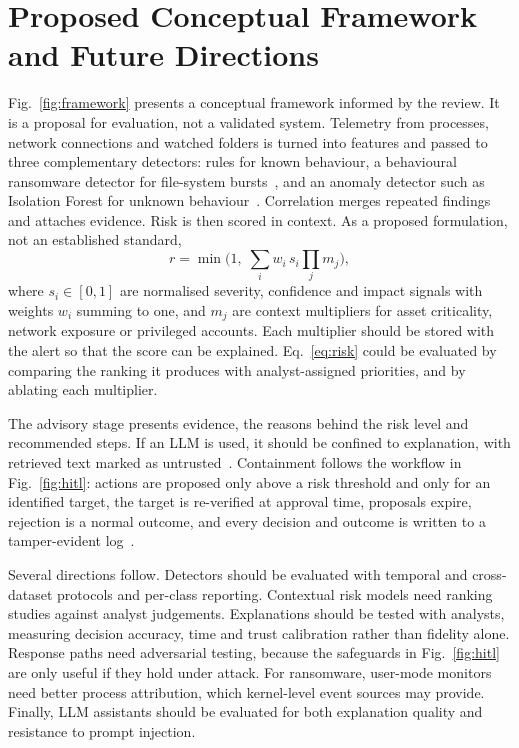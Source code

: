 \documentclass[conference]{IEEEtran}
\begin{document}
\section{Proposed Conceptual Framework and Future Directions}
Fig.~\ref{fig:framework} presents a conceptual framework informed by the review. It is a proposal for evaluation, not a validated system. Telemetry from processes, network connections and watched folders is turned into features and passed to three complementary detectors: rules for known behaviour, a behavioural ransomware detector for file-system bursts~\cite{scaife2016cryptolock,continella2016shieldfs}, and an anomaly detector such as Isolation Forest for unknown behaviour~\cite{liu2008isolation}. Correlation merges repeated findings and attaches evidence. Risk is then scored in context. As a proposed formulation, not an established standard,
\begin{equation}
r=\min\!\Big(1,\;\sum_{i} w_i\, s_i \prod_{j} m_j\Big),
\label{eq:risk}
\end{equation}
where $s_i\in[0,1]$ are normalised severity, confidence and impact signals with weights $w_i$ summing to one, and $m_j$ are context multipliers for asset criticality, network exposure or privileged accounts. Each multiplier should be stored with the alert so that the score can be explained. Eq.~\eqref{eq:risk} could be evaluated by comparing the ranking it produces with analyst-assigned priorities, and by ablating each multiplier.

The advisory stage presents evidence, the reasons behind the risk level and recommended steps. If an LLM is used, it should be confined to explanation, with retrieved text marked as untrusted~\cite{greshake2023indirect}. Containment follows the workflow in Fig.~\ref{fig:hitl}: actions are proposed only above a risk threshold and only for an identified target, the target is re-verified at approval time, proposals expire, rejection is a normal outcome, and every decision and outcome is written to a tamper-evident log~\cite{schneier1999secure}.

Several directions follow. Detectors should be evaluated with temporal and cross-dataset protocols and per-class reporting. Contextual risk models need ranking studies against analyst judgements. Explanations should be tested with analysts, measuring decision accuracy, time and trust calibration rather than fidelity alone. Response paths need adversarial testing, because the safeguards in Fig.~\ref{fig:hitl} are only useful if they hold under attack. For ransomware, user-mode monitors need better process attribution, which kernel-level event sources may provide. Finally, LLM assistants should be evaluated for both explanation quality and resistance to prompt injection.
\end{document}

